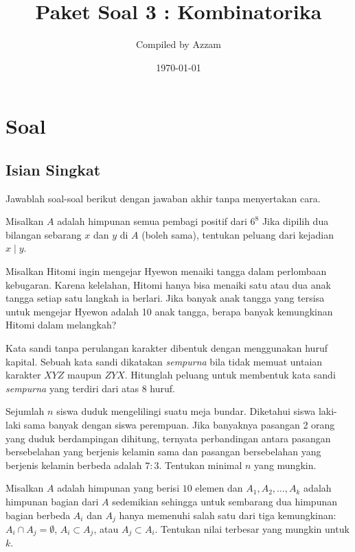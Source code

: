 \documentclass[11pt]{scrartcl}
\begin{document}
	\title{Paket Soal 3 : Kombinatorika} %
	\date{\today}
	\author{Compiled by Azzam}
	\maketitle
	\newpage
	
	\section{Soal}
\subsection{Isian Singkat}
Jawablah soal-soal berikut dengan jawaban akhir tanpa menyertakan cara.

	\begin{soalbaru}
		Misalkan $A$ adalah himpunan semua pembagi positif dari $6^8$ Jika dipilih dua bilangan sebarang $x$ dan $y$ di $A$ (boleh sama), tentukan peluang dari kejadian $x \mid y$. 
	\end{soalbaru}
	
	\begin{soalbaru}
		Misalkan Hitomi ingin mengejar Hyewon menaiki tangga dalam perlombaan kebugaran. Karena kelelahan, Hitomi hanya bisa menaiki satu atau dua anak tangga setiap satu langkah ia berlari. Jika banyak anak tangga yang tersisa untuk mengejar Hyewon adalah 10 anak tangga, berapa banyak kemungkinan Hitomi dalam melangkah?
	\end{soalbaru}
	
	\begin{soalbaru}
		Kata sandi tanpa perulangan karakter dibentuk dengan menggunakan huruf kapital. Sebuah kata sandi dikatakan \textit{sempurna} bila tidak memuat untaian karakter $XYZ$ maupun $ZYX$. Hitunglah peluang untuk membentuk kata sandi \textit{sempurna} yang terdiri dari atas 8 huruf.
	\end{soalbaru}
	
	\begin{soalbaru}
			Sejumlah $n$ siswa duduk mengelilingi suatu meja bundar. Diketahui siswa laki-laki sama banyak dengan siswa perempuan. Jika banyaknya pasangan 2 orang yang duduk berdampingan
			dihitung, ternyata perbandingan antara pasangan bersebelahan yang berjenis kelamin sama dan
			pasangan bersebelahan yang berjenis kelamin berbeda adalah $7 : 3$. Tentukan minimal $n$ yang
			mungkin.
		\end{soalbaru}
	
	\begin{soalbaru}
		Misalkan $A$ adalah himpunan yang berisi $10$ elemen dan $A_1,A_2,\dots,A_k$ adalah himpunan bagian dari $A$ sedemikian sehingga untuk sembarang dua himpunan bagian berbeda $A_i$ dan $A_j$ hanya memenuhi salah satu dari tiga kemungkinan: $A_i \cap A_j = \emptyset$, $A_i \subset A_j$, atau $A_j \subset A_i$. Tentukan nilai terbesar yang mungkin untuk $k$. %
	\end{soalbaru}
	
\end{document}
